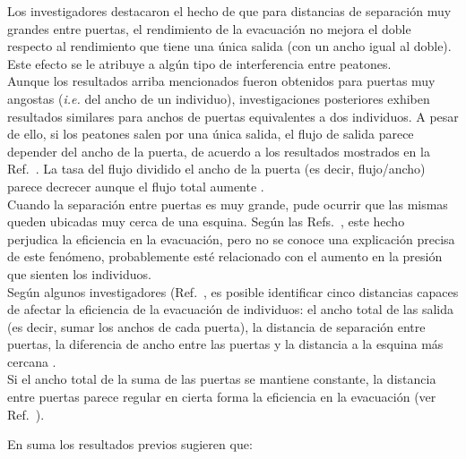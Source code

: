 \noindent Los investigadores destacaron el hecho de que para distancias de separación muy grandes entre puertas, el rendimiento de la evacuación no mejora el doble respecto al rendimiento que tiene una única salida (con un ancho igual al doble). Este efecto se le atribuye a algún tipo de interferencia entre peatones\cite{perez1}.\\

\noindent Aunque los resultados arriba mencionados fueron obtenidos para puertas muy angostas (\emph{i.e.} del ancho de un individuo),
investigaciones posteriores exhiben resultados similares para anchos de puertas equivalentes a dos individuos. A pesar de ello, si los peatones salen por una única salida, el flujo de salida parece depender del ancho de la puerta, de acuerdo a los resultados mostrados en la Ref.~\cite{daoliang1}. La tasa del flujo dividido el ancho de la puerta (es decir, flujo/ancho) parece decrecer aunque el flujo total aumente \cite{daoliang1}.\\
 
Cuando la separación entre puertas es muy grande, pude ocurrir que las mismas queden ubicadas muy cerca de una esquina. Según las 
Refs.~\cite{kirchner1,daoliang1}, este hecho perjudica la eficiencia 
en la evacuación, pero no se conoce una explicación precisa de este 
fenómeno, probablemente esté relacionado con el aumento en la presión que sienten los individuos. \\

\noindent Según algunos investigadores (Ref.~\cite{huanhuan1}, es posible identificar cinco distancias capaces de afectar la eficiencia de la evacuación de individuos: el ancho total de las salida (es decir, sumar los anchos de cada puerta), la distancia de separación entre puertas, la diferencia de ancho entre las puertas y la distancia a la esquina más cercana \cite{huanhuan1}. \\

Si el ancho total de la suma de las puertas se mantiene constante, la distancia entre puertas parece regular en cierta forma la eficiencia en la evacuación (ver Ref.~\cite{huanhuan1}).


En suma los resultados previos sugieren que:

